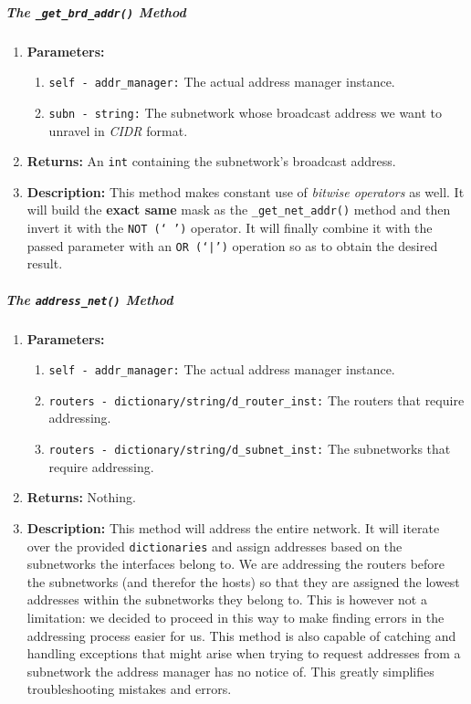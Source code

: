         \subparagraph{The \texttt{\_get\_brd\_addr()} Method}
            \begin{enumerate}
                \item \textbf{Parameters:}
                \begin{enumerate}
                    \item \texttt{self - addr\_manager:} The actual address manager instance.
                    \item \texttt{subn - string:} The subnetwork whose broadcast address we want to unravel in \textit{CIDR} format.
                \end{enumerate}
                \item \textbf{Returns:} An \texttt{int} containing the subnetwork's broadcast address.
                \item \textbf{Description:} This method makes constant use of \textit{bitwise operators} as well. It will build the \textbf{exact same} mask as the \texttt{\_get\_net\_addr()} method and then invert it with the \texttt{NOT (`~')} operator. It will finally combine it with the passed parameter with an \texttt{OR (`|')} operation so as to obtain the desired result.
            \end{enumerate}

        \subparagraph{The \texttt{address\_net()} Method}
            \begin{enumerate}
                \item \textbf{Parameters:}
                \begin{enumerate}
                    \item \texttt{self - addr\_manager:} The actual address manager instance.
                    \item \texttt{routers - dictionary/string/d\_router\_inst:} The routers that require addressing.
                    \item \texttt{routers - dictionary/string/d\_subnet\_inst:} The subnetworks that require addressing.
                \end{enumerate}
                \item \textbf{Returns:} Nothing.
                \item \textbf{Description:} This method will address the entire network. It will iterate over the provided \texttt{dictionaries} and assign addresses based on the subnetworks the interfaces belong to. We are addressing the routers before the subnetworks (and therefor the hosts) so that they are assigned the lowest addresses within the subnetworks they belong to. This is however not a limitation: we decided to proceed in this way to make finding errors in the addressing process easier for us. This method is also capable of catching and handling exceptions that might arise when trying to request addresses from a subnetwork the address manager has no notice of. This greatly simplifies troubleshooting mistakes and errors.
            \end{enumerate}

